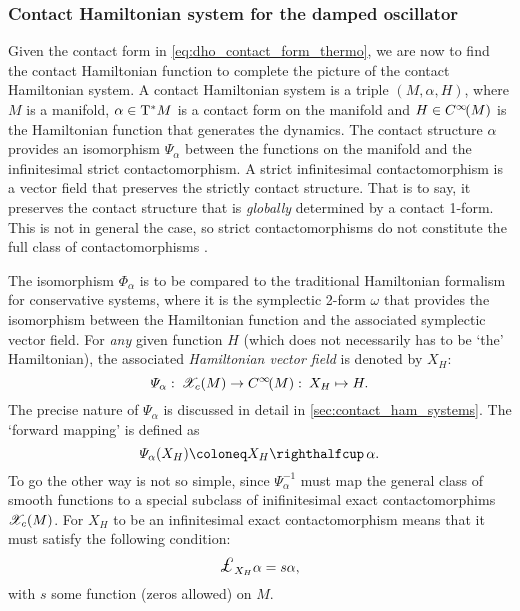 \subsubsection{Contact Hamiltonian system for the damped oscillator}
Given the contact form in \cref{eq:dho_contact_form_thermo}, we are now to find the contact Hamiltonian function to complete the picture of the contact Hamiltonian system.
A contact Hamiltonian system is a triple $(M, \alpha, H)$, where $M$ is a manifold, $\alpha \in \mathrm{T}^*M$ is a contact form on the manifold and $H \in C^\infty\!\qty(M)$ is the Hamiltonian function that generates the dynamics. The contact structure $\alpha$ provides an isomorphism $\Psi_{\alpha}$ between the functions on the manifold and the infinitesimal strict contactomorphism. A strict infinitesimal contactomorphism is a vector field that preserves the strictly contact structure. That is to say, it preserves the contact structure that is \emph{globally} determined by a contact 1-form. This is not in general the case, so strict contactomorphisms do not constitute the full class of contactomorphisms \cite{Libermann1987,Arnold1989a}.

The isomorphism $\Phi_\alpha$ is to be compared to the traditional Hamiltonian formalism for conservative systems, where it is the symplectic 2-form $\omega$ that provides the isomorphism between the Hamiltonian function and the associated symplectic vector field.
For \emph{any} given function $H$ (which does not necessarily has to be `the' Hamiltonian), the associated \emph{Hamiltonian vector field} is denoted by $X_H$:
\begin{equation}
    \Psi_\alpha: \: \mathscr{X}_{c}\qty(M) \to C^\infty\!\qty(M): \: X_H \mapsto H. 
\end{equation}
The precise nature of $\Psi_\alpha$ is discussed in detail in \cref{sec:contact_ham_systems}. The `forward mapping' is defined as
$$ \Psi_\alpha(X_H) \coloneq \intpr{X_H}{\alpha}. $$
To go the other way is not so simple, since $ \Psi_\alpha^{-1}$ must map the general class of smooth functions to a special subclass of inifinitesimal exact contactomorphims $\mathscr{X}_{c}\qty(M)$. For $X_H$ to be an infinitesimal exact contactomorphism means that it must satisfy the following condition:
$$ \lied{X_H}{\alpha} = s \alpha, $$
with $s$ some function (zeros allowed) on $M$.

